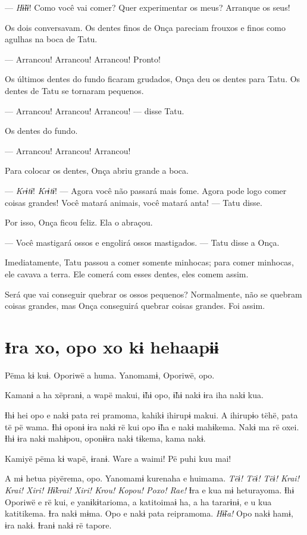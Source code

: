 --- \textit{Hɨ̃ɨɨ}! Como você vai comer? Quer experimentar os meus? Arranque
os seus! 

Os dois conversavam. Os dentes finos de Onça pareciam frouxos e finos
como agulhas na boca de Tatu.

--- Arrancou! Arrancou! Arrancou! Pronto! 

Os últimos dentes do fundo ficaram grudados, Onça deu os dentes para
Tatu. Os dentes de Tatu se tornaram pequenos.

--- Arrancou! Arrancou! Arrancou! --- disse Tatu.

Os dentes do fundo. 

--- Arrancou! Arrancou! Arrancou! 

Para colocar os dentes, Onça abriu grande a boca. 

--- \textit{Krɨtɨ}! \textit{Krɨtɨ}! --- Agora você não passará mais fome. Agora pode logo
comer coisas grandes! Você matará animais, você matará anta! --- Tatu
disse. 

Por isso, Onça ficou feliz. Ela o abraçou. 

--- Você mastigará ossos e engolirá ossos mastigados. --- Tatu disse a
Onça. 

Imediatamente, Tatu  passou a comer somente minhocas; para comer minhocas, ele
cavava a terra. Ele comerá com esses dentes, eles comem assim. 

Será que vai conseguir quebrar os ossos pequenos? Normalmente, não se
quebram coisas grandes, mas Onça conseguirá quebrar coisas grandes.
Foi assim. 
 
\chapter[Ɨra xo, opo xo kɨ he haapɨɨ]{Ɨra xo, opo xo kɨ he\break haapɨɨ}

 Pëma kɨ kuɨ. Oporiwë a huma. Yanomamɨ, Oporiwë, opo. 

Kamanɨ a ha xëpranɨ, a wapë makui, ɨ̃hɨ opo, ɨ̃hɨ nakɨ ɨra iha nakɨ kua. 

Ɨhɨ hei opo e nakɨ pata rei pramoma, kahikɨ ihirupɨ makui. A ihirupɨo
tëhë, pata të pë wama. Ɨhɨ oponɨ ɨra nakɨ rë kui opo ɨ̃ha e nakɨ
mahɨkema. Nakɨ ma rë oxei. Ɨhɨ ɨra nakɨ mahɨpou, oponɨɨra nakɨ tɨkema,
kama nakɨ. 

Kamiyë pëma kɨ wapë, ɨranɨ. Ware a waimi! Pë puhi kuu mai! 

A mɨ hetua piyërema, opo. Yanomamɨ kurenaha e huimama. \textit{Tëɨ! Tëɨ! Tëɨ!
Krai! Krai! Xiri! Hɨ̃krai! Xiri! Krou! Kopou! Poxo! Rae!} Ɨra e kua mɨ
heturayoma. Ɨhɨ Oporiwë e rë kui, e yanɨkɨtarioma, a katitoimaɨ ha, a ha
tararɨnɨ, e u kua katitikema. Ɨra nakɨ mɨma. Opo e nakɨ pata reipramoma.
\textit{Hɨ̃ɨa! }Opo nakɨ hamɨ, ɨra nakɨ. Ɨranɨ nakɨ rë tapore. 

